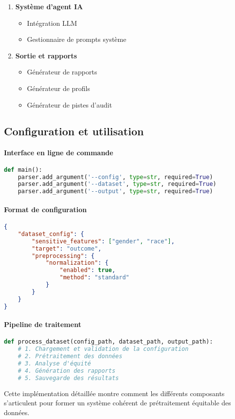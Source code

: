 \begin{enumerate}
    \item \textbf{Système d'agent IA}
    \begin{itemize}
        \item Intégration LLM
        \item Gestionnaire de prompts système
    \end{itemize}

    \item \textbf{Sortie et rapports}
    \begin{itemize}
        \item Générateur de rapports
        \item Générateur de profils
        \item Générateur de pistes d'audit
    \end{itemize}
\end{enumerate}

\subsection{Configuration et utilisation}

\paragraph{Interface en ligne de commande}
\begin{lstlisting}[language=Python, caption=Interface CLI]
def main():
    parser.add_argument('--config', type=str, required=True)
    parser.add_argument('--dataset', type=str, required=True)
    parser.add_argument('--output', type=str, required=True)
\end{lstlisting}

\paragraph{Format de configuration}
\begin{lstlisting}[language=json, caption=Exemple de configuration JSON]
{
    "dataset_config": {
        "sensitive_features": ["gender", "race"],
        "target": "outcome",
        "preprocessing": {
            "normalization": {
                "enabled": true,
                "method": "standard"
            }
        }
    }
}
\end{lstlisting}

\paragraph{Pipeline de traitement}
\begin{lstlisting}[language=Python, caption=Pipeline principal]
def process_dataset(config_path, dataset_path, output_path):
    # 1. Chargement et validation de la configuration
    # 2. Prétraitement des données
    # 3. Analyse d'équité
    # 4. Génération des rapports
    # 5. Sauvegarde des résultats
\end{lstlisting}

Cette implémentation détaillée montre comment les différents composants s'articulent pour former un système cohérent de prétraitement équitable des données.
